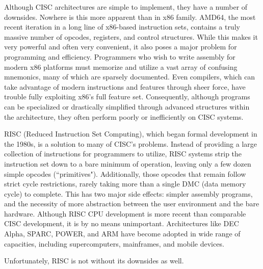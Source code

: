 \documentclass[english]{article}
\begin{document}
Although CISC architectures are simple to implement, they have a number of downsides. Nowhere is this more apparent than in x86 family. AMD64, the most recent iteration in a long line of x86-based instruction sets, contains a truly massive number of opcodes, registers, and control structures. While this makes it very powerful and often very convenient, it also poses a major problem for programming and efficiency. Programmers who wish to write assembly for modern x86 platforms must memorize and utilize a vast array of confusing mnemonics, many of which are sparsely documented. Even compilers, which can take advantage of modern instructions and features through sheer force, have trouble fully exploiting x86's full feature set. Consequently, although programs can be specialized or drastically simplified through advanced structures within the architecture, they often perform poorly or inefficiently on CISC systems. 

RISC (Reduced Instruction Set Computing), which began formal development in the 1980s, is a solution to many of CISC's problems. Instead of providing a large collection of instructions for programmers to utilize, RISC systems strip the instruction set down to a bare minimum of operation, leaving only a few dozen simple opcodes (``primitives"). Additionally, those opcodes that remain follow strict cycle restrictions, rarely taking more than a single DMC (data memory cycle) to complete. This has two major side effects: simpler assembly programs, and the necessity of more abstraction between the user environment and the bare hardware. Although RISC CPU development is more recent than comparable CISC development, it is by no means unimportant. Architectures like DEC Alpha, SPARC, POWER, and ARM have become adopted in wide range of capacities, including supercomputers, mainframes, and mobile devices.

Unfortunately, RISC is not without its downsides as well.
\end{document}
